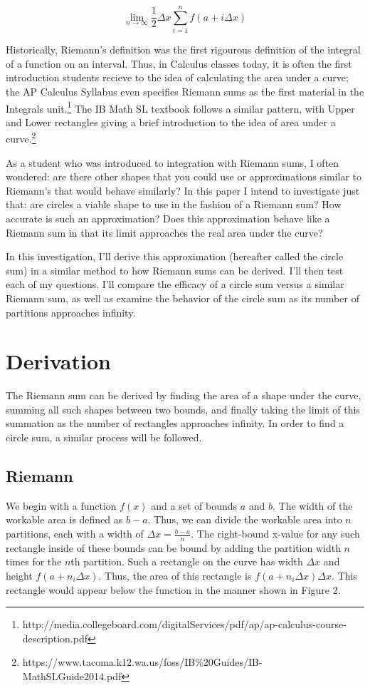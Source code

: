 \documentclass{article}
\begin{document}
    \[ \displaystyle\lim_{n \to \infty}\frac{1}{2}\Delta x\sum_{i=1}^n f(a+i\Delta x) \]

    Historically, Riemann's definition was the first rigourous definition of the integral of a function on an interval. Thus, in Calculus classes today, it is often the first introduction students recieve to the idea of calculating the area under a curve; the AP Calculus Syllabus even specifies Riemann sums as the first material in the Integrals unit.\footnote{http://media.collegeboard.com/digitalServices/pdf/ap/ap-calculus-course-description.pdf} The IB Math SL textbook follows a similar pattern, with Upper and Lower rectangles giving a brief introduction to the idea of area under a curve.\footnote{https://www.tacoma.k12.wa.us/foss/IB\%20Guides/IB-MathSLGuide2014.pdf}

    As a student who was introduced to integration with Riemann sums, I often wondered: are there other shapes that you could use or approximations similar to Riemann's that would behave similarly? In this paper I intend to investigate just that: are circles a viable shape to use in the fashion of a Riemann sum? How accurate is such an approximation? Does this approximation behave like a Riemann sum in that its limit approaches the real area under the curve?

    In this investigation, I'll derive this approximation (hereafter called the circle sum) in a similar method to how Riemann sums can be derived. I'll then test each of my questions. I'll compare the efficacy of a circle sum versus a similar Riemann sum, as well as examine the behavior of the circle sum as its number of partitions approaches infinity.

  \section{Derivation}
    The Riemann sum can be derived by finding the area of a shape under the curve, summing all such shapes between two bounds, and finally taking the limit of this summation as the number of rectangles approaches infinity. In order to find a circle sum, a similar process will be followed.

    \subsection{Riemann}
      We begin with a function \( f(x) \) and a set of bounds \( a \) and \( b \). The width of the workable area is defined as \( b-a \). Thus, we can divide the workable area into \( n \) partitions, each with a width of \( \Delta x = \frac{b-a}{n} \). The right-bound x-value for any such rectangle inside of these bounds can be bound by adding the partition width \( n \) times for the \(n\)th partition. Such a rectangle on the curve has width \( \Delta x \) and height \( f(a+n_i\Delta x) \). Thus, the area of this rectangle is \( f(a+n_i\Delta x)\Delta x \). This rectangle would appear below the function in the manner shown in Figure 2.
\end{document}
